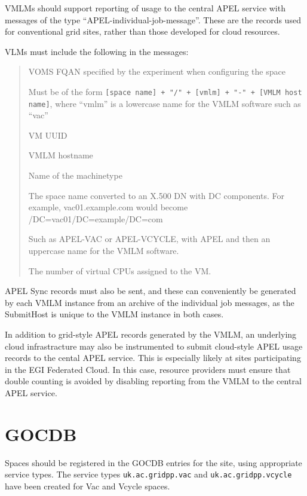 \documentclass[12pt,a4paper]{article}
\begin{document}
VMLMs should support reporting of usage to the central APEL service
with messages of the type ``APEL-individual-job-message''. These are
the records used for conventional grid sites, rather than those developed
for cloud resources. 

VLMs must include the following in the messages:
\begin{quote}
\begin{description}
\setlength{\parskip}{0pt}
\item[FQAN] VOMS FQAN specified by the experiment when configuring the space
\item[SubmitHost] Must be of the form 
  \texttt{[space name] + "/" + [vmlm] + "-" + [VMLM host name]}, where
  ``vmlm'' is a lowercase name for the VMLM software such as ``vac''
\item[LocalJobId] VM UUID
\item[LocalUserId] VMLM hostname
\item[Queue] Name of the machinetype
\item[GlobalUserName] The space name converted to an X.500 DN with DC
  components. For example, vac01.example.com would become /DC=vac01/DC=example/DC=com
\item[InfrastructureDescription] Such as APEL-VAC or APEL-VCYCLE, with APEL and then
  an uppercase name for the VMLM software.
\item[Processors] The number of virtual CPUs assigned to the VM.
\end{description}
\end{quote}

APEL Sync records must also be sent, and these can conveniently be
generated by each VMLM instance from an archive of the individual
job messages, as the SubmitHost is unique to the VMLM instance
in both cases.

In addition to grid-style APEL records generated by the VMLM, an underlying
cloud infrastracture may also be instrumented to submit cloud-style APEL 
usage records to the cental APEL service.
This is especially likely at sites participating in the EGI Federated Cloud.
In this case, resource providers must ensure that double counting is avoided
by disabling reporting from the VMLM to the central APEL service. 

\section{GOCDB}
\label{sec:gocdb}

Spaces should be registered in the GOCDB entries for the site, using 
appropriate service types. The service types \texttt{uk.ac.gridpp.vac} and 
\texttt{uk.ac.gridpp.vcycle} have been created for Vac and Vcycle
spaces.
\end{document}
